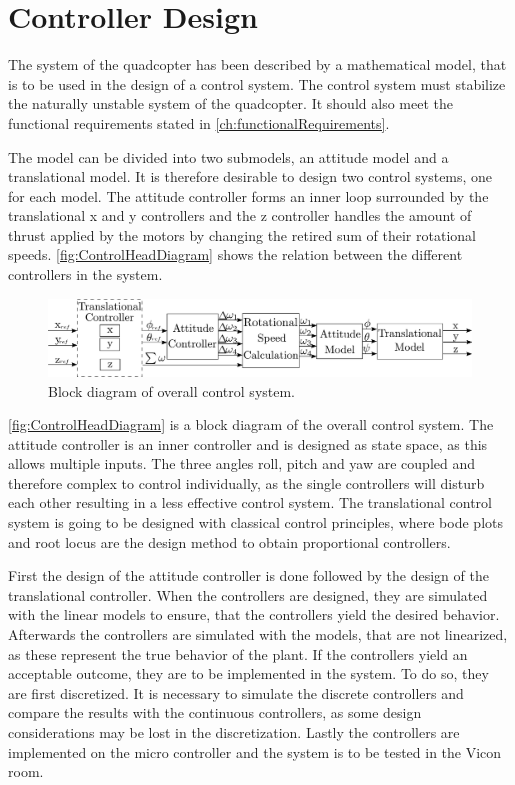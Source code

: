 \chapter{Controller Design}\label{chap:Control}
The system of the quadcopter has been described by a mathematical model, that is to be used in the design of a control system. The control system must stabilize the naturally unstable system of the quadcopter. It should also meet the functional requirements stated in \autoref{ch:functionalRequirements}.

The model can be divided into two submodels, an attitude model and a translational model. It is therefore desirable to design two control systems, one for each model. The attitude controller forms an inner loop surrounded by the translational x and y controllers and the z controller handles the amount of thrust applied by the motors by changing the retired sum of their rotational speeds. \autoref{fig:ControlHeadDiagram} shows the relation between the different controllers in the system.
\begin{figure}[H]
	\centering
	\includegraphics[width=1 \textwidth]{figures/generalcontroldiagram}
	\caption{Block diagram of overall control system.}
	\label{fig:ControlHeadDiagram}
\end{figure}

\autoref{fig:ControlHeadDiagram} is a block diagram of the overall control system.
The attitude controller is an inner controller and is designed as state space, as this allows multiple inputs. The three angles roll, pitch and yaw are coupled and therefore complex to control individually, as the single controllers will disturb each other resulting in a less effective control system. The translational control system is going to be designed with classical control principles, where bode plots and root locus are the design method to obtain proportional controllers. 

First the design of the attitude controller is done followed by the design of the translational controller. 
When the controllers are designed, they are simulated with the linear models to ensure, that the controllers yield the desired behavior. Afterwards the controllers are simulated with the models, that are not linearized, as these represent the true behavior of the plant. If the controllers yield an acceptable outcome, they are to be implemented in the system. To do so, they are first discretized. It is necessary to simulate the discrete controllers and compare the results with the continuous controllers, as some design considerations may be lost in the discretization. Lastly the controllers are implemented on the micro controller and the system is to be tested in the Vicon room. 